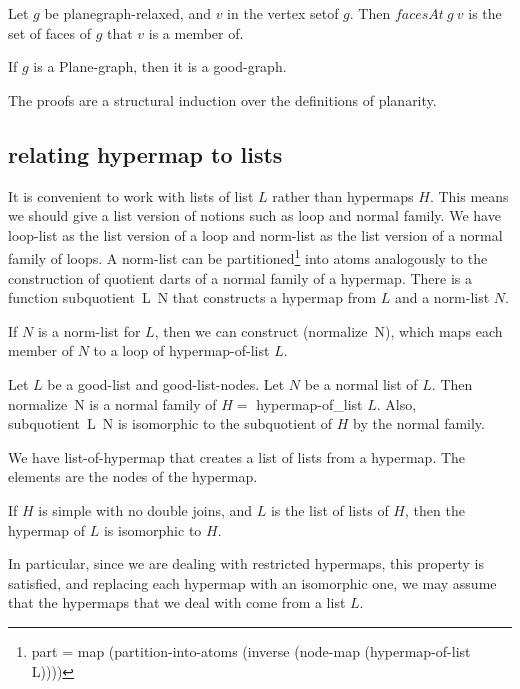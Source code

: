 \begin{lemma}
Let $g$ be planegraph-relaxed, and $v$ in the vertex setof $g$.
Then $facesAt~g~v$ is the set of faces of $g$ that $v$ is a member of.
\end{lemma}

\begin{lemma}
If $g$ is a Plane-graph, then it is a good-graph.
\end{lemma}

The proofs are a structural induction over the definitions of planarity.

\subsection{relating hypermap to lists}

It is convenient to work with lists of list $L$ rather than hypermaps $H$.  This means
we should give a list version of notions such as loop and normal family.
We have loop-list as the list version of a loop and norm-list as the list
version of  a normal family of loops.  A norm-list can be partitioned\footnote{ 
part = map (partition-into-atoms (inverse (node-map (hypermap-of-list L))))} into
atoms analogously to the construction of quotient darts of a normal family of a hypermap.
There is a function subquotient~L~N that constructs a hypermap from $L$ and a norm-list $N$.

If $N$ is a norm-list for $L$, then we can construct (normalize~N), which maps each member of $N$
to a loop of hypermap-of-list $L$.

\begin{lemma}\guid{} Let $L$ be a good-list and good-list-nodes.  Let $N$ be a normal list of $L$.
Then normalize~N is a normal family of $H= $ hypermap-of_list $L$.  Also, subquotient~L~N is isomorphic
to the subquotient of $H$ by the normal family.
\end{lemma}

We have list-of-hypermap that creates a list of lists from a hypermap.
The elements are the nodes of the hypermap.

\begin{lemma}\guid{}  If $H$ is simple with no double joins, and $L$ is the
list of lists of $H$, then the hypermap of $L$ is isomorphic to $H$.
\end{lemma}

In particular, since we are dealing with restricted hypermaps, this property is satisfied, and replacing each hypermap
with an isomorphic one,  we may
assume that the hypermaps that we deal with come from a list $L$.

